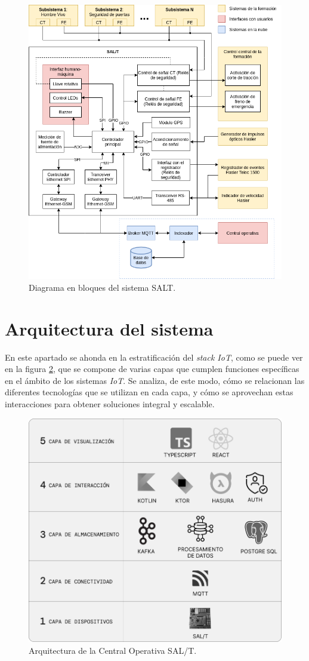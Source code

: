 \begin{figure}[htpb]
\centering 
\includegraphics[width=.8\textwidth]{Figures/diagrama_salt_con_central.png}
\caption{Diagrama en bloques del sistema SALT.}
\label{fig:diagBloques}
\end{figure}


\newpage
\section{Arquitectura del sistema}

En este apartado se ahonda en la estratificación del \textit{stack IoT}, como se puede ver en la figura \ref{fig:salt-architecture}, que se compone de varias capas que cumplen funciones específicas en el ámbito de los sistemas \textit{IoT}. Se analiza, de este modo, cómo se relacionan las diferentes tecnologías que se utilizan en cada capa, y cómo se aprovechan estas interacciones para obtener soluciones integral y escalable. 


\begin{figure}[htpb]
  \centering 
  \includegraphics[width=.75\textwidth]{Figures/cuadro.jpg}
  \caption{Arquitectura de la Central Operativa SAL/T.}
  \label{fig:salt-architecture}
\end{figure}


